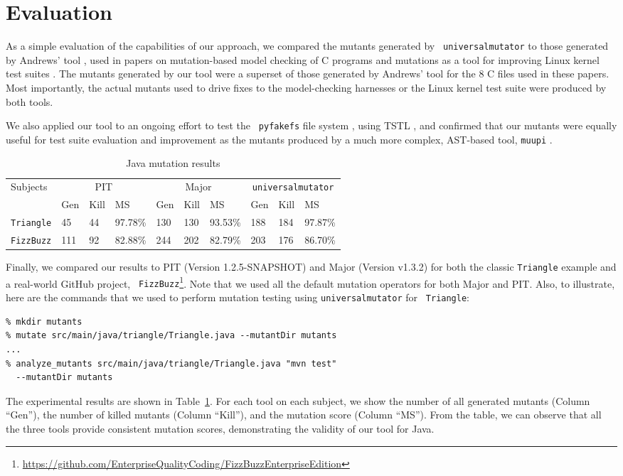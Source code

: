 \section{Evaluation}

As a simple evaluation of the capabilities of our approach, we compared the mutants generated by {\tt
  universalmutator} to those generated by Andrews' tool \cite{mutant},
used in papers on mutation-based model checking of C programs
\cite{ASE15} and mutations as a tool for improving Linux kernel test
suites \cite{mutation17}.  The mutants generated by our tool were a
superset of those generated by Andrews' tool for the 8 C files used in
these papers.  Most importantly, the actual mutants used to drive
fixes to the model-checking harnesses or the Linux kernel test suite
were produced by both tools.

We also applied our tool to an ongoing effort to test the {\tt
  pyfakefs} file system \cite{pyfakefs}, using TSTL \cite{nfm15,tstlsttt},
and confirmed that our mutants were equally useful for test suite
evaluation and improvement as the mutants produced by a much more
complex, AST-based tool, {\tt muupi} \cite{muupi}.
\begin{table}[t!]
  \scriptsize
  \caption{\label{tab:java} Java mutation results}
  \begin{tabular}{|l|lll|lll|lll|}
    \hline
    Subjects&\multicolumn{3}{c|}{PIT}&\multicolumn{3}{c|}{Major}&\multicolumn{3}{c|}{{\tt universalmutator}}\\
    &Gen&Kill&MS&Gen&Kill&MS&Gen&Kill&MS\\\hline
\hline
    {\tt Triangle}&45&44&97.78\%&130&130&93.53\%&188&184&97.87\%\\
{\tt FizzBuzz}&111&92&82.88\%&244&202&82.79\%&203&176&86.70\%\\
  \hline\end{tabular}
  \end{table}

Finally, we compared our results to PIT (Version 1.2.5-SNAPSHOT)
\cite{pittest} and Major (Version v1.3.2) \cite{major} for both the
classic {\tt Triangle} example and a real-world GitHub project, {\tt
  FizzBuzz}\footnote{\url{https://github.com/EnterpriseQualityCoding/FizzBuzzEnterpriseEdition}
}.  Note that we used all the default mutation operators for both
Major and PIT. Also, to illustrate, here are the commands that we used to
perform mutation testing using {\tt universalmutator} for {\tt
  Triangle}:
{\scriptsize
\begin{verbatim}
% mkdir mutants
% mutate src/main/java/triangle/Triangle.java --mutantDir mutants
...
% analyze_mutants src/main/java/triangle/Triangle.java "mvn test"
  --mutantDir mutants
\end{verbatim}
} The experimental results are shown in Table~\ref{tab:java}. For each
tool on each subject, we show the number of all generated mutants
(Column ``Gen''), the number of killed mutants (Column ``Kill''), and
the mutation score (Column ``MS''). From the table, we can observe that all the three tools provide consistent mutation scores, demonstrating the validity of our tool for Java.

